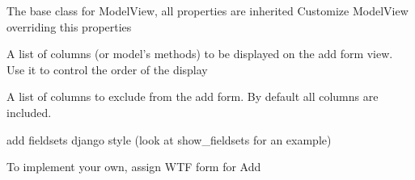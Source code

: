 \documentclass[letterpaper,10pt,english]{sphinxmanual}
\begin{document}
\begin{fulllineitems}
\label{api:flask.ext.appbuilder.baseviews.BaseCRUDView}
The base class for ModelView, all properties are inherited
Customize ModelView overriding this properties

\begin{fulllineitems}
\label{api:flask.ext.appbuilder.baseviews.BaseCRUDView.add_columns}
A list of columns (or model's methods) to be displayed on the add form view.
Use it to control the order of the display

\end{fulllineitems}


\begin{fulllineitems}
\label{api:flask.ext.appbuilder.baseviews.BaseCRUDView.add_exclude_columns}
A list of columns to exclude from the add form. By default all columns are included.

\end{fulllineitems}


\begin{fulllineitems}
\label{api:flask.ext.appbuilder.baseviews.BaseCRUDView.add_fieldsets}
add fieldsets django style (look at show\_fieldsets for an example)

\end{fulllineitems}


\begin{fulllineitems}
\label{api:flask.ext.appbuilder.baseviews.BaseCRUDView.add_form}
To implement your own, assign WTF form for Add

\end{fulllineitems}



\end{fulllineitems}
\end{document}
